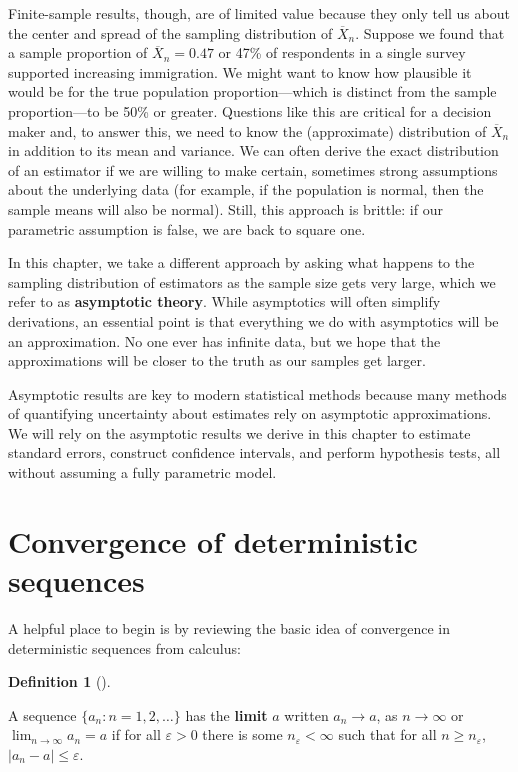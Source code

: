 \documentclass[
  13pt,
  letterpaper,
  DIV=11,
  numbers=noendperiod]{scrreprt}
\newcommand{\Xbar}{\overline{X}}
\theoremstyle{plain}
\theoremstyle{plain}
\theoremstyle{definition}
\newtheorem{definition}{Definition}[chapter]
\theoremstyle{definition}
\theoremstyle{remark}
\begin{document}
Finite-sample results, though, are of limited value because they only
tell us about the center and spread of the sampling distribution of
\(\Xbar_n\). Suppose we found that a sample proportion of
\(\Xbar_n = 0.47\) or 47\% of respondents in a single survey supported
increasing immigration. We might want to know how plausible it would be
for the true population proportion---which is distinct from the sample
proportion---to be 50\% or greater. Questions like this are critical for
a decision maker and, to answer this, we need to know the (approximate)
distribution of \(\Xbar_n\) in addition to its mean and variance. We can
often derive the exact distribution of an estimator if we are willing to
make certain, sometimes strong assumptions about the underlying data
(for example, if the population is normal, then the sample means will
also be normal). Still, this approach is brittle: if our parametric
assumption is false, we are back to square one.

In this chapter, we take a different approach by asking what happens to
the sampling distribution of estimators as the sample size gets very
large, which we refer to as \textbf{asymptotic theory}. While
asymptotics will often simplify derivations, an essential point is that
everything we do with asymptotics will be an approximation. No one ever
has infinite data, but we hope that the approximations will be closer to
the truth as our samples get larger.

Asymptotic results are key to modern statistical methods because many
methods of quantifying uncertainty about estimates rely on asymptotic
approximations. We will rely on the asymptotic results we derive in this
chapter to estimate standard errors, construct confidence intervals, and
perform hypothesis tests, all without assuming a fully parametric model.

\section{Convergence of deterministic
sequences}\label{convergence-of-deterministic-sequences}

A helpful place to begin is by reviewing the basic idea of convergence
in deterministic sequences from calculus:

\begin{definition}[]\protect\hypertarget{def-limit}{}\label{def-limit}

A sequence \(\{a_n: n = 1, 2, \ldots\}\) has the \textbf{limit} \(a\)
written \(a_n \rightarrow a\), as \(n\rightarrow \infty\) or
\(\lim_{n\rightarrow \infty} a_n = a\) if for all \(\varepsilon > 0\)
there is some \(n_{\varepsilon} < \infty\) such that for all
\(n \geq n_{\varepsilon}\), \(|a_n - a| \leq \varepsilon\).

\end{definition}
\end{document}
